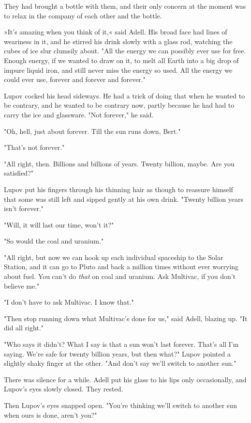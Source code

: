 \documentclass[11pt,twocolumn,paper=a5,pagesize]{article}
\newcommand{\q}[1]{»#1«}
\begin{document}
They had brought a bottle with them, and their only concern at the moment was to relax in the company of each other and the bottle.

\q{It's amazing when you think of it,} said Adell. His broad face had lines of 
weariness in it, and he stirred his drink slowly with a glass rod, watching the cubes of ice slur clumsily about. "All the energy we can possibly ever use for free. Enough energy, if we wanted to draw on it, to melt all Earth into a big drop of impure liquid iron, and still never miss the energy so used. All the energy we could ever use, forever and forever and forever."

Lupov cocked his head sideways. He had a trick of doing that when he wanted to be contrary, and he wanted to be contrary now, partly because he had had to carry the ice and glassware. "Not forever," he said.

"Oh, hell, just about forever. Till the sun runs down, Bert."

"That's not forever."

"All right, then. Billions and billions of years. Twenty billion, maybe. Are you satisfied?"

Lupov put his fingers through his thinning hair as though to reassure himself that some was still left and sipped gently at his own drink. "Twenty billion years isn't forever."

"Will, it will last our time, won't it?"

"So would the coal and uranium."

"All right, but now we can hook up each individual spaceship to the Solar Station, and it can go to Pluto and back a million times without ever worrying about fuel. You can't do \textit{that} on coal and uranium. Ask Multivac, if you don't believe me."

"I don't have to ask Multivac. I know that."

"Then stop running down what Multivac's done for us," said Adell, blazing up. "It did all right."

"Who says it didn't? What I say is that a sun won't last forever. That's all I'm saying. We're safe for twenty billion years, but then what?" Lupov pointed a slightly shaky finger at the other. "And don't say we'll switch to another sun."

There was silence for a while. Adell put his glass to his lips only occasionally, and Lupov's eyes slowly closed. They rested.

Then Lupov's eyes snapped open. "You're thinking we'll switch to another sun when ours is done, aren't you?"
\end{document}
